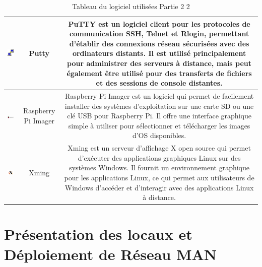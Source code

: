 \begin{table}[H]
\begin{center}
\begin{tabular}{|c{3cm}|c{3cm}|c{10cm}|}
\hline
\includegraphics[width=3cm]{Images/Logo-Putty.png} & Putty & PuTTY est un logiciel client pour les protocoles de communication SSH, Telnet et Rlogin, permettant d'établir des connexions réseau sécurisées avec des ordinateurs distants. Il est utilisé principalement pour administrer des serveurs à distance, mais peut également être utilisé pour des transferts de fichiers et des sessions de console distantes. \\
\hline
\includegraphics[width=3cm]{Images/Logo-Raspberry.png} & Raspberry Pi Imager & Raspberry Pi Imager est un logiciel qui permet de facilement installer des systèmes d'exploitation sur une carte SD ou une clé USB pour Raspberry Pi. Il offre une interface graphique simple à utiliser pour sélectionner et télécharger les images d'OS disponibles. \\
\hline
\includegraphics[width=3cm]{Images/xminglogo.png} & Xming & Xming est un serveur d'affichage X open source qui permet d'exécuter des applications graphiques Linux sur des systèmes Windows. Il fournit un environnement graphique pour les applications Linux, ce qui permet aux utilisateurs de Windows d'accéder et d'interagir avec des applications Linux à distance. \\
\hline
\end{tabular}
\caption{Tableau du logiciel utilisées Partie 2 2}
\label{1}
\end{center}
\end{table}


\section{Présentation des locaux et Déploiement de Réseau MAN}
